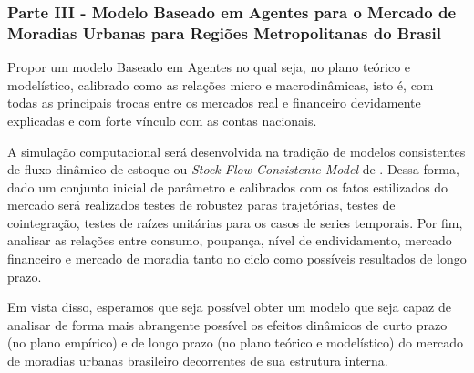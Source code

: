 \subsubsection*{Parte III - Modelo Baseado em Agentes para o Mercado de Moradias Urbanas para Regiões Metropolitanas do Brasil}

 Propor um modelo Baseado em Agentes no qual seja, no plano teórico e modelístico, calibrado como as relações micro e macrodinâmicas, isto é, com todas as principais trocas entre os mercados real e financeiro devidamente explicadas e com forte vínculo com as contas nacionais.

A simulação computacional será desenvolvida na tradição de modelos consistentes de fluxo dinâmico de estoque ou \textit{Stock Flow Consistente Model} de . Dessa forma, dado um conjunto inicial de parâmetro e calibrados com os fatos estilizados do mercado será realizados testes de robustez paras trajetórias, testes de cointegração, testes de raízes unitárias para os casos de series temporais. Por fim, analisar as relações entre consumo, poupança, nível de endividamento, mercado financeiro e mercado de moradia tanto no ciclo como possíveis resultados de longo prazo. 

Em vista disso, esperamos que seja possível obter um modelo que seja capaz de analisar de forma mais abrangente possível os efeitos dinâmicos de curto prazo (no plano empírico) e de longo prazo (no plano teórico e modelístico) do mercado de moradias urbanas brasileiro decorrentes de sua estrutura interna.
 

